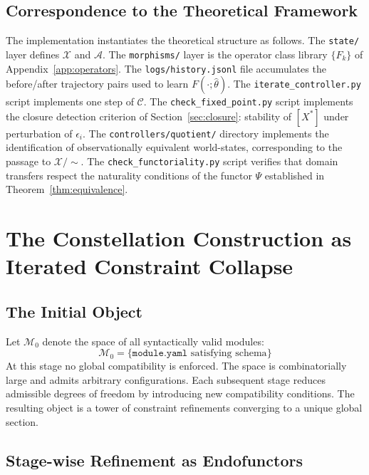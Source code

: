 \documentclass[11pt, oneside]{article}
\newcommand{\Xmod}{\mathcal{X}/{\sim}}
\begin{document}
\subsection{Correspondence to the Theoretical Framework}

The implementation instantiates the theoretical structure as follows. The
\texttt{state/} layer defines $\mathcal{X}$ and $\mathcal{A}$. The
\texttt{morphisms/} layer is the operator class library $\{F_k\}$ of
Appendix~\ref{app:operators}. The \texttt{logs/history.jsonl} file accumulates the
before/after trajectory pairs used to learn $F(\cdot;\hat{\theta})$. The
\texttt{iterate\_controller.py} script implements one step of $\mathcal{C}$.
The \texttt{check\_fixed\_point.py} script implements the closure detection criterion
of Section~\ref{sec:closure}: stability of $[X^*]$ under perturbation of $\epsilon_i$.
The \texttt{controllers/quotient/} directory implements the identification of
observationally equivalent world-states, corresponding to the passage to $\Xmod$.
The \texttt{check\_functoriality.py} script verifies that domain transfers respect
the naturality conditions of the functor $\Psi$ established in
Theorem~\ref{thm:equivalence}.

\section{The Constellation Construction as Iterated Constraint Collapse}
\label{app:filtration}

\subsection{The Initial Object}

Let $\mathcal{M}_0$ denote the space of all syntactically valid modules:
\[
\mathcal{M}_0 = \{ \texttt{module.yaml} \text{ satisfying schema} \}
\]
At this stage no global compatibility is enforced. The space is combinatorially large
and admits arbitrary configurations. Each subsequent stage reduces admissible degrees of
freedom by introducing new compatibility conditions. The resulting object is a tower of
constraint refinements converging to a unique global section.

\subsection{Stage-wise Refinement as Endofunctors}
\end{document}
